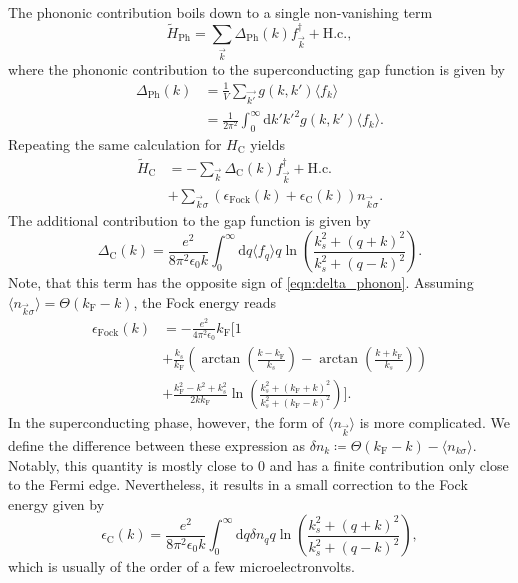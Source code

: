\documentclass[
    reprint, 
    aps,
    preprintnumbers,
    twocolumn,
    prb,
    superscriptaddress
]{revtex4-2}
\newcommand{\expec}[1]{\langle #1 \rangle}
\newcommand{\kf}{k_{\mathrm{F}}}
\newcommand{\eFock}{\epsilon_\mathrm{Fock}}
\newcommand{\deltaC}{\Delta_\mathrm{C}}
\newcommand{\deltaPh}{\Delta_\mathrm{Ph}}
\begin{document}
The phononic contribution boils down to a single non-vanishing term
\begin{equation}
  \tilde{H}_\mathrm{Ph} = \sum_{\vec{k}} \deltaPh (k) f_{\vec{k}}^\dagger + \mathrm{H.c.},
\end{equation}
where the phononic contribution to the superconducting gap function is given by
\begin{align}
\label{eqn:delta_phonon}
  \deltaPh (k) &= \frac{1}{V} \sum_{\vec{k'}} g(k,k')  \expec{f_k} \nonumber \\
    &= \frac{1}{2 \pi^2} \int_0^\infty \mathrm{d} k' k'^2 g(k, k') \expec{ f_k }.
\end{align}
Repeating the same calculation for $H_\mathrm{C}$ yields
\begin{align}
  \tilde{H}_\mathrm{C} &= - \sum_{\vec{k}} \deltaC (k) f_{\vec{k}}^\dagger + \mathrm{H.c.} \nonumber \\
    &+ \sum_{\vec{k} \sigma} (\eFock(k) + \epsilon_\mathrm{C}(k)) n_{\vec{k} \sigma}.
\end{align}
The additional contribution to the gap function is given by
\begin{equation}
\label{eqn:delta_coulomb}
  \deltaC (k) = \frac{e^2}{8 \pi^2 \epsilon_0 k} \int_0^\infty \mathrm{d} q \expec{f_{q}} q \ln \left( \frac{k_s^2 + (q + k)^2}{k_s^2 + (q - k)^2} \right).
\end{equation}
Note, that this term has the opposite sign of \eqref{eqn:delta_phonon}.
Assuming $\expec{n_{\vec{k} \sigma}} = \Theta (\kf - k)$, the Fock energy reads
\begin{align}
\label{eqn:fock_coulomb}
  \eFock (k) &= - \frac{e^2}{4 \pi^2 \epsilon_0} \kf \bigg[1 \nonumber \\
  &+ \frac{k_s}{\kf } \left( \arctan \left( \frac{k - \kf}{k_s} \right) - \arctan \left( \frac{k + \kf}{k_s} \right) \right) \nonumber \\
  &+ \frac{\kf^2 - k^2 + k_s^2}{2 k \kf} \ln \left( \frac{k_s^2 + (\kf + k)^2}{k_s^2 + (\kf - k)^2} \right) \bigg].
\end{align}
In the superconducting phase, however, the form of $\expec{n_{\vec{k}}}$ is more complicated.
We define the difference between these expression as $\delta n_{k} \coloneqq \Theta (\kf - k) - \expec{n_{k\sigma}}$.
Notably, this quantity is mostly close to $0$ and has a finite contribution only close to the Fermi edge.
Nevertheless, it results in a small correction to the Fock energy given by
\begin{equation}
\label{eqn:fock_corr}
  \epsilon_\mathrm{C}(k) = \frac{e^2}{8 \pi^2 \epsilon_0 k} \int_0^\infty \mathrm{d} q \delta n_{q} q \ln \left( \frac{k_s^2 + (q + k)^2}{k_s^2 + (q - k)^2} \right),
\end{equation}
which is usually of the order of a few microelectronvolts.
\end{document}
